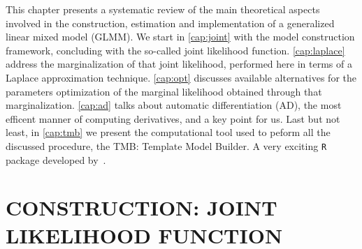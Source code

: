 This chapter presents a systematic review of the main theoretical
aspects involved in the construction, estimation and implementation of a
generalized linear mixed model (GLMM). We start in \autoref{cap:joint}
with the model construction framework, concluding with the so-called
joint likelihood function. \autoref{cap:laplace} address the
marginalization of that joint likelihood, performed here in terms of a
Laplace approximation technique. \autoref{cap:opt} discusses available
alternatives for the parameters optimization of the marginal likelihood
obtained through that marginalization. \autoref{cap:ad} talks about
automatic differentiation (AD), the most efficent manner of computing
derivatives, and a key point for us. Last but not least, in
\autoref{cap:tmb} we present the computational tool used to peform all
the discussed procedure, the TMB: Template Model Builder. A very
exciting \texttt{R} \cite{R18} package developed by~.

\section{CONSTRUCTION: JOINT LIKELIHOOD FUNCTION}
\label{cap:joint}

